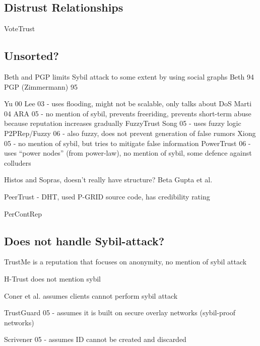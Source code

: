 \subsection{Distrust Relationships}
VoteTrust\cite{xue2013votetrust}

\subsection{Unsorted?}

Beth and PGP limits Sybil attack to some extent by using social graphs
Beth 94\cite{beth1994valuation}
PGP (Zimmermann) 95\cite{zimmermann1995official}

Yu 00\cite{yu2000social}
Lee 03\cite{lee2003cooperative} - uses flooding, might not be scalable, only talks about DoS
Marti 04\cite{marti2004limited}
ARA 05\cite{ham2005ara} - no mention of sybil, prevents freeriding, prevents short-term abuse because reputation increases gradually
FuzzyTrust Song 05\cite{song2005trusted} - uses fuzzy logic
P2PRep/Fuzzy 06\cite{aringhieri2006fuzzy} - also fuzzy, does not prevent generation of false rumors
Xiong 05\cite{xiong2007countering} - no mention of sybil, but tries to mitigate false information
PowerTrust 06\cite{zhou2007powertrust} - uses ``power nodes'' (from power-law), no mention of sybil, some defence against colluders

Histos and Sopras\cite{zacharia2000collaborative}, doesn't really have structure?
Beta\cite{jsang2002beta}
Gupta et al.\cite{gupta2003reputation}

PeerTrust\cite{xiong2004peertrust} - DHT, used P-GRID source code, has credibility rating

PerContRep\cite{yan2014percontrep}


\subsection{Does not handle Sybil-attack?}
TrustMe\cite{singh2003trustme} is a reputation that focuses on anonymity, no mention of sybil attack

H-Trust\cite{zhao2009htrust} does not mention sybil

Coner et al.\cite{conner2009trust} assumes clients cannot perform sybil attack

TrustGuard 05\cite{srivatsa2005trustguard} - assumes it is built on secure overlay networks (sybil-proof networks)

Scrivener 05\cite{nandi2005scrivener} - assumes ID cannot be created and discarded

